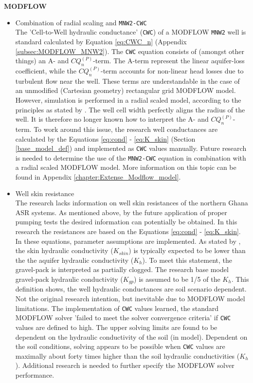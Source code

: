 \textbf{MODFLOW}
\begin{itemize}
\item{Combination of radial scaling and \texttt{MNW2-CWC}} \\
The 'Cell-to-Well hydraulic conductance' (\texttt{CWC}) of a MODFLOW \texttt{MNW2} well is standard calculated by Equation \ref{eq:CWC_n} (Appendix \ref{subsec:MODFLOW_MNW2}). The \texttt{CWC} equation consists of (amongst other things) an A- and $CQ_{n}^{(P)}$-term. The A-term represent the linear aquifer-loss coefficient, while the $CQ_{n}^{(P)}$-term accounts for non-linear head losses due to turbulent flow near the well. These terms are understandable in the case of an unmodified (Cartesian geometry) rectangular grid MODFLOW model. However, simulation is performed in a radial scaled model, according to the principles as stated by \citet{Langevin2008}. The well cell width perfectly aligns the radius of the well. It is therefore no longer known how to interpret the A- and $CQ_{n}^{(P)}$-term. To work around this issue, the research well conductances are calculated by the Equations \ref{eq:cond} - \ref{eq:K_skin} (Section \ref{base_model_def}) and implemented as \texttt{CWC} values manually. Future research is needed to determine the use of the \texttt{MNW2-CWC} equation in combination with a radial scaled MODFLOW model. More information on this topic can be found in Appendix \ref{chapter:Extense_Modflow_model}. 
\item{Well skin resistance} \\
The research lacks information on well skin resistances of the northern Ghana ASR systems. As mentioned above, by the future application of proper pumping tests the desired information can potentially be obtained. In this research the resistances are based on the Equations \ref{eq:cond} - \ref{eq:K_skin}. In these equations, parameter assumptions are implemented. As stated by \citet{LeonardF.KonikowGeorgeZ.HornbergerKeithJ.Halford2009}, the skin hydraulic conductivity ($K_{skin}$) is typically expected to be lower than the the aquifer hydraulic conductivity ($K_{h}$). To meet this statement, the gravel-pack is interpreted as partially clogged. The research base model gravel-pack hydraulic conductivity ($K_{gp}$) is assumed to be 1/5 of the $K_{h}$. This definition shows, the well hydraulic conductances are soil scenario dependent. Not the original research intention, but inevitable due to MODFLOW model limitations. The implementation of \texttt{CWC} values learned, the standard MODFLOW solver 'failed to meet the solver convergence criteria' if \texttt{CWC} values are defined to high. The upper solving limits are found to be dependent on the hydraulic conductivity of the soil (in model). Dependent on the soil conditions, solving appears to be possible when \texttt{CWC} values are maximally about forty times higher than the soil hydraulic conductivities ($K_{h}$). Additional research is needed to further specify the MODFLOW solver performance. \\
\end{itemize}

